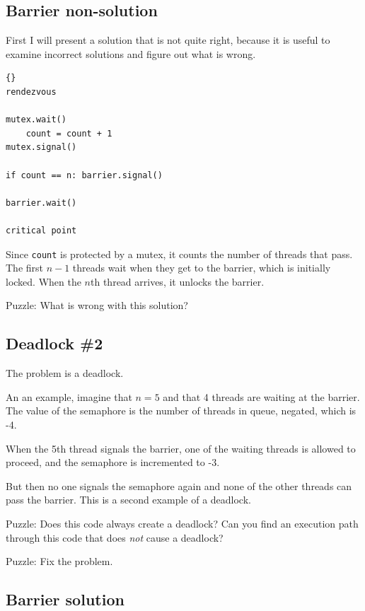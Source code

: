 \documentclass{book}
\newcommand{\clearemptydoublepage}{\newpage\cleardoublepage}
\begin{document}
\subsection {Barrier non-solution}

First I will present a solution that is not quite right, because
it is useful to examine incorrect solutions and figure out what
is wrong.

\begin{lstlisting}[caption={Barrier non-solution}]{}
rendezvous

mutex.wait()
    count = count + 1
mutex.signal()

if count == n: barrier.signal()

barrier.wait()

critical point
\end{lstlisting}

Since {\tt count} is protected by a mutex, it counts the number of
threads that pass.  The first $n-1$ threads wait when they get to the
barrier, which is initially locked.  When the $n$th thread arrives, it
unlocks the barrier.

Puzzle:  What is wrong with this solution?


\clearemptydoublepage
\subsection{Deadlock \#2}

The problem is a deadlock.

An an example, imagine that $n=5$
and that 4 threads are waiting at the barrier.  The value
of the semaphore is the number of threads in queue, negated, 
which is -4.

When the 5th thread signals the barrier, one of the waiting
threads is allowed to proceed, and the semaphore is incremented
to -3.

But then no one signals the semaphore again and none of the
other threads can pass the barrier.
This is a second example of a deadlock.

Puzzle: Does this code always create a deadlock?  Can you find an
execution path through this code that does {\em not} cause a deadlock?

Puzzle: Fix the problem.


\clearemptydoublepage
\subsection{Barrier solution}
\label{barrier}
\end{document}
